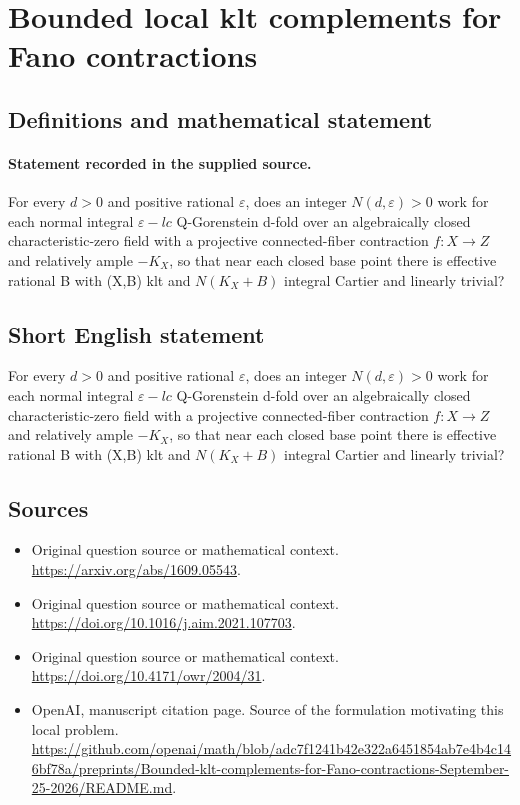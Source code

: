 \documentclass[11pt]{article}
\begin{document}
\section*{Bounded local klt complements for Fano contractions}\label{statement}
\subsection{Definitions and mathematical statement}
\paragraph{Statement recorded in the supplied source.}
For every $d>0$ and positive rational $\varepsilon $, does an integer $N(d,\varepsilon )>0$ work for each normal integral $\varepsilon -lc$ Q-Gorenstein d-fold over an algebraically closed characteristic-zero field with a projective connected-fiber contraction $f:X\to Z$ and relatively ample $-K_X$, so that near each closed base point there is effective rational B with (X,B) klt and $N(K_X+B)$ integral Cartier and linearly trivial?
\subsection{Short English statement}
For every $d>0$ and positive rational $\varepsilon $, does an integer $N(d,\varepsilon )>0$ work for each normal integral $\varepsilon -lc$ Q-Gorenstein d-fold over an algebraically closed characteristic-zero field with a projective connected-fiber contraction $f:X\to Z$ and relatively ample $-K_X$, so that near each closed base point there is effective rational B with (X,B) klt and $N(K_X+B)$ integral Cartier and linearly trivial?
\subsection{Sources}
\begin{itemize}
\item[S1] Original question source or mathematical context.
\url{https://arxiv.org/abs/1609.05543}.
\item[S2] Original question source or mathematical context.
\url{https://doi.org/10.1016/j.aim.2021.107703}.
\item[S3] Original question source or mathematical context.
\url{https://doi.org/10.4171/owr/2004/31}.
\item[S4] OpenAI, manuscript citation page. Source of the formulation motivating this local problem.
\url{https://github.com/openai/math/blob/adc7f1241b42e322a6451854ab7e4b4c146bf78a/preprints/Bounded-klt-complements-for-Fano-contractions-September-25-2026/README.md}.
\end{itemize}
\end{document}
